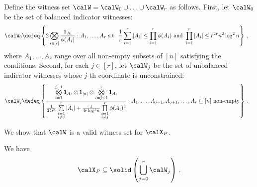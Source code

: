\documentclass[11pt,a4paper]{article}
\begin{document}
\begin{definition}\label{def:witness}
    Define the witness set $\calW= \calW_0 \cup \ldots \cup \calW_r$ as follows. First, let $\calW_0$ be the set of
    balanced indicator witnesses:
    \begin{align*}
        \calW_0 &\defeq \left\{2\bigotimes_{i\in [r]} \frac{\mathbf 1_{A_i}} {\phi(A_i)} : A_1, \ldots, A_r\textnormal{ s.t. } \frac 1r \sum_{i=1}^r |A_i| \le \prod_{i=1}^r \phi(A_i) \text{ and } \prod_{i=1}^r |A_i|\le r^{2r} n^2\log^2 n\right\}\,,
    \end{align*}
    where $A_1, \ldots, A_r$ range over
    all non-empty subsets of $[n]$ 
    satisfying the conditions. Second, for each $j\in [r]$,  let $\calW_j$ be the set of unbalanced indicator witnesses whose $j$-th coordinate is unconstrained:
    \begin{align*}
        \calW_j &\defeq \left\{\frac {\bigotimes\limits_{i=1}^{j-1}\mathbf 1_{A_i}\otimes  \mathbf 1_{[n]} \otimes \bigotimes\limits_{i=j+1}^{r}\mathbf 1_{A_i} } {\frac 1 {24 r^4}\sum\limits_{\substack{i=1\\i\neq j}}^r |A_i| + \frac 1 {4r \log^4 n}\prod\limits_{\substack{i=1\\i\neq j}}^r \phi(A_i)^2} : A_1,\ldots,A_{j-1}, A_{j+1},\ldots,A_r\subseteq [n]\text{ non-empty}\right\}\,.
    \end{align*}
\end{definition}

We show that $\calW$ is a valid
witness set for $\calX_P$.

\begin{lemma} \label{lem:solidContain}
    We have
    \[  
        \calX_P \subseteq \solid\left(\bigcup\limits_{j=0}^r \calW_j\right)\,.
    \]
\end{lemma}
\end{document}
